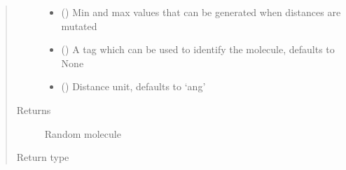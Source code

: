 \documentclass[letterpaper,10pt,english]{sphinxmanual}
\begin{document}
\begin{fulllineitems}
\begin{quote}
\begin{description}
\begin{itemize}
\item {} 
\sphinxAtStartPar
{} (\sphinxstyleliteralemphasis{\sphinxupquote{{[}}}\sphinxstyleliteralemphasis{\sphinxupquote{, }}\sphinxstyleliteralemphasis{\sphinxupquote{{]}}}) \textendash{} Min and max values that can be generated when distances are mutated

\item {} 
\sphinxAtStartPar
{} (\sphinxstyleliteralemphasis{\sphinxupquote{, }}) \textendash{} A tag which can be used to identify the molecule, defaults to None

\item {} 
\sphinxAtStartPar
{} (\sphinxstyleliteralemphasis{\sphinxupquote{, }}) \textendash{} Distance unit, defaults to ‘ang’

\end{itemize}

\item[{Returns}] \leavevmode
\sphinxAtStartPar
Random molecule

\item[{Return type}] \leavevmode
\sphinxAtStartPar
{\hyperref[\detokenize{MolOpt.molecular:MolOpt.molecular.molecular.Molecule}]{}}

\end{description}\end{quote}

\end{fulllineitems}

\end{document}
